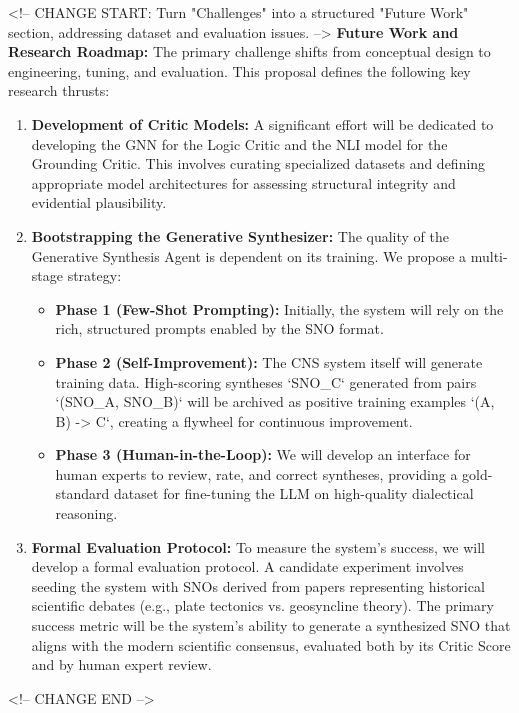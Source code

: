 \documentclass[12pt, a4paper]{article}
\begin{document}
<!-- CHANGE START: Turn "Challenges" into a structured "Future Work" section, addressing dataset and evaluation issues. -->
\textbf{Future Work and Research Roadmap:} The primary challenge shifts from conceptual design to engineering, tuning, and evaluation. This proposal defines the following key research thrusts:

\begin{enumerate}
    \item \textbf{Development of Critic Models:} A significant effort will be dedicated to developing the GNN for the Logic Critic and the NLI model for the Grounding Critic. This involves curating specialized datasets and defining appropriate model architectures for assessing structural integrity and evidential plausibility.
    
    \item \textbf{Bootstrapping the Generative Synthesizer:} The quality of the Generative Synthesis Agent is dependent on its training. We propose a multi-stage strategy:
        \begin{itemize}
            \item \textbf{Phase 1 (Few-Shot Prompting):} Initially, the system will rely on the rich, structured prompts enabled by the SNO format.
            \item \textbf{Phase 2 (Self-Improvement):} The CNS system itself will generate training data. High-scoring syntheses `SNO_C` generated from pairs `(SNO_A, SNO_B)` will be archived as positive training examples `(A, B) -> C`, creating a flywheel for continuous improvement.
            \item \textbf{Phase 3 (Human-in-the-Loop):} We will develop an interface for human experts to review, rate, and correct syntheses, providing a gold-standard dataset for fine-tuning the LLM on high-quality dialectical reasoning.
        \end{itemize}

    \item \textbf{Formal Evaluation Protocol:} To measure the system's success, we will develop a formal evaluation protocol. A candidate experiment involves seeding the system with SNOs derived from papers representing historical scientific debates (e.g., plate tectonics vs. geosyncline theory). The primary success metric will be the system's ability to generate a synthesized SNO that aligns with the modern scientific consensus, evaluated both by its Critic Score and by human expert review.
\end{enumerate}
<!-- CHANGE END -->
\end{document}
